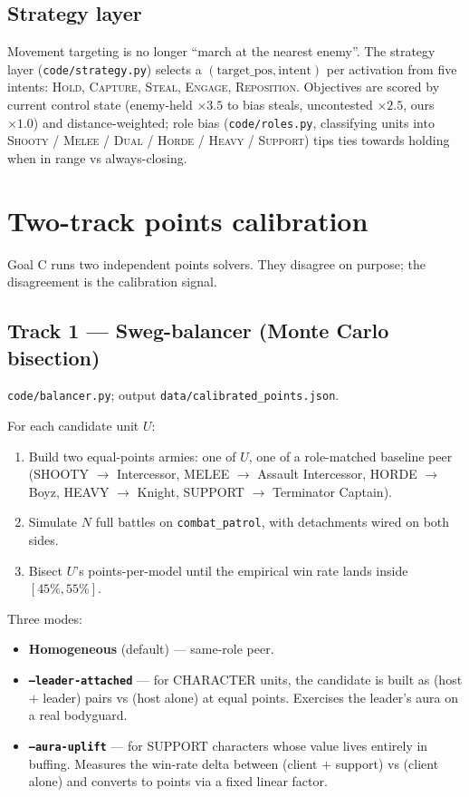 \documentclass[11pt,a4paper]{article}
\begin{document}
\subsection{Strategy layer}
Movement targeting is no longer ``march at the nearest enemy''. The
strategy layer (\texttt{code/strategy.py}) selects a $(\text{target\_pos},
\text{intent})$ per activation from five intents: \textsc{Hold},
\textsc{Capture}, \textsc{Steal}, \textsc{Engage}, \textsc{Reposition}.
Objectives are scored by current control state (enemy-held $\times 3.5$
to bias steals, uncontested $\times 2.5$, ours $\times 1.0$) and
distance-weighted; role bias (\texttt{code/roles.py}, classifying units
into \textsc{Shooty} / \textsc{Melee} / \textsc{Dual} / \textsc{Horde}
/ \textsc{Heavy} / \textsc{Support}) tips ties towards holding when in
range vs always-closing.

\section{Two-track points calibration}
\label{sec:two-track}

Goal C runs two independent points solvers. They disagree on purpose;
the disagreement is the calibration signal.

\subsection{Track 1 --- Sweg-balancer (Monte Carlo bisection)}
\texttt{code/balancer.py}; output \texttt{data/calibrated\_points.json}.

For each candidate unit $U$:
\begin{enumerate}[itemsep=2pt]
  \item Build two equal-points armies: one of $U$, one of a role-matched
    baseline peer (SHOOTY $\to$ Intercessor, MELEE $\to$ Assault
    Intercessor, HORDE $\to$ Boyz, HEAVY $\to$ Knight, SUPPORT $\to$
    Terminator Captain).
  \item Simulate $N$ full battles on \texttt{combat\_patrol}, with
    detachments wired on both sides.
  \item Bisect $U$'s points-per-model until the empirical win rate lands
    inside $[45\%, 55\%]$.
\end{enumerate}

Three modes:
\begin{itemize}[itemsep=2pt]
  \item \textbf{Homogeneous} (default) --- same-role peer.
  \item \textbf{\texttt{--leader-attached}} --- for CHARACTER units, the
    candidate is built as (host $+$ leader) pairs vs (host alone) at
    equal points. Exercises the leader's aura on a real bodyguard.
  \item \textbf{\texttt{--aura-uplift}} --- for SUPPORT characters whose
    value lives entirely in buffing. Measures the win-rate delta between
    (client $+$ support) vs (client alone) and converts to points via a
    fixed linear factor.
\end{itemize}
\end{document}
